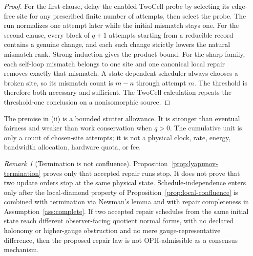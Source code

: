 \documentclass[11pt]{article}
\theoremstyle{remark}
\newtheorem{remark}[theorem]{Remark}
\theoremstyle{plain}
\begin{document}
\begin{proof}
For the first clause, delay the enabled TwoCell probe by selecting its
edge-free site for any prescribed finite number of attempts, then select the
probe.  The run normalizes one attempt later while the initial mismatch stays
one.  For the second clause, every block of \(q+1\) attempts starting from a
reducible record contains a genuine change, and each such change strictly
lowers the natural mismatch rank.  Strong induction gives the product bound.
For the sharp family, each self-loop mismatch belongs to one site and one
canonical local repair removes exactly that mismatch.  A state-dependent
scheduler always chooses a broken site, so its mismatch count is \(m-n\)
through attempt \(m\).  The threshold is therefore both necessary and
sufficient.  The TwoCell calculation repeats the threshold-one conclusion on
a nonisomorphic source.
\end{proof}

The premise in (ii) is a bounded stutter allowance.  It is stronger than
eventual fairness and weaker than work conservation when \(q>0\).  The
cumulative unit is only a count of chosen-site attempts; it is not a physical
clock, rate, energy, bandwidth allocation, hardware quota, or fee.

\begin{remark}[Termination is not confluence]\label{rem:termination-not-confluence}
Proposition~\ref{prop:lyapunov-termination} proves only that accepted repair runs stop. It does not
prove that two update orders stop at the same physical state. Schedule-independence enters only after
the local-diamond property of Proposition~\ref{prop:local-confluence} is combined with termination
via Newman's lemma and with repair completeness in Assumption~\ref{ass:complete}. If two accepted
repair schedules from the same initial state reach different observer-facing quotient normal forms,
with no declared holonomy or higher-gauge obstruction and no mere gauge-representative difference,
then the proposed repair law is not OPH-admissible as a consensus mechanism.
\end{remark}
\end{document}

